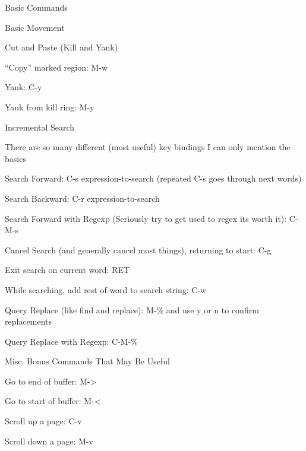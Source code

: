 \documentclass[presentation]{beamer}
\begin{document}
\begin{frame}[label=sec-2]{Basic Commands}
\begin{block}{Basic Movement}
\begin{block}{Cut and Paste (Kill and Yank)}
\begin{block}{``Copy'' marked region: M-w}
\end{block}
\begin{block}{Yank: C-y}
\end{block}
\begin{block}{Yank from kill ring: M-y}
\end{block}
\end{block}
\begin{block}{Incremental Search}
\begin{block}{There are so many different (most useful) key bindings I can only mention the basics}
\end{block}
\begin{block}{Search Forward: C-s expression-to-search (repeated C-s goes through next words)}
\end{block}
\begin{block}{Search Backward: C-r expression-to-search}
\end{block}
\begin{block}{Search Forward with Regexp (Seriously try to get used to regex its worth it): C-M-s}
\end{block}
\begin{block}{Cancel Search (and generally cancel most things), returning to start: C-g}
\end{block}
\begin{block}{Exit search on current word: RET}
\end{block}
\begin{block}{While searching, add rest of word to search string: C-w}
\end{block}
\begin{block}{Query Replace (like find and replace): M-\% and use y or n to confirm replacements}
\end{block}
\begin{block}{Query Replace with Regexp: C-M-\%}
\end{block}
\end{block}
\begin{block}{Misc. Bonus Commands That May Be Useful}
\begin{block}{Go to end of buffer: M->}
\end{block}
\begin{block}{Go to start of buffer: M-<}
\end{block}
\begin{block}{Scroll up a page: C-v}
\end{block}
\begin{block}{Scroll down a page: M-v}
\end{block}

\end{block}
\end{block}
\end{frame}
\end{document}
